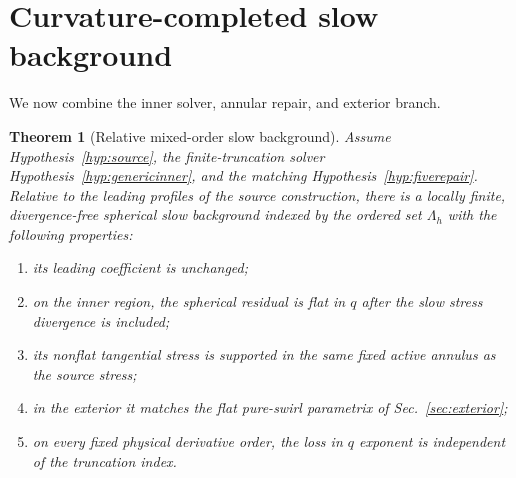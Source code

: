 \documentclass[aps,prd,reprint,superscriptaddress,nofootinbib,floatfix]{revtex4-2}
\newtheorem{theorem}{Theorem}
\theoremstyle{definition}
\theoremstyle{remark}
\newcommand{\Lam}{\Lambda_h}
\begin{document}
\section{Curvature-completed slow background}\label{sec:slowcomplete}

We now combine the inner solver, annular repair, and exterior branch.

\begin{theorem}[Relative mixed-order slow background]\label{thm:slowbackground}
	Assume Hypothesis~\ref{hyp:source}, the finite-truncation solver Hypothesis~\ref{hyp:genericinner}, and the matching Hypothesis~\ref{hyp:fiverepair}.  Relative to the leading profiles of the source construction, there is a locally finite, divergence-free spherical slow background indexed by the ordered set $\Lam$ with the following properties:
	\begin{enumerate}[label=(\roman*),leftmargin=*]
		\item its leading coefficient is unchanged;
		\item on the inner region, the spherical residual is flat in $q$ after the slow stress divergence is included;
		\item its nonflat tangential stress is supported in the same fixed active annulus as the source stress;
		\item in the exterior it matches the flat pure-swirl parametrix of Sec.~\ref{sec:exterior};
		\item on every fixed physical derivative order, the loss in $q$ exponent is independent of the truncation index.
	\end{enumerate}
\end{theorem}
\end{document}
